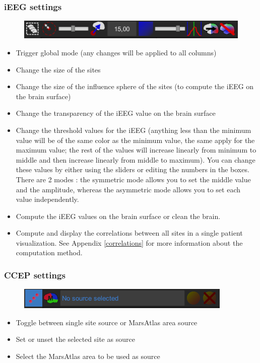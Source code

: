 \documentclass[a4paper]{article}
\begin{document}
\subsubsection{iEEG settings}
\begin{figure}[H]
\begin{center}
\includegraphics[scale=0.5]{iEEGSettings.png}
\end{center}
\end{figure}
\begin{itemize}
\item Trigger global mode (any changes will be applied to all columns)
\item Change the size of the sites
\item Change the size of the influence sphere of the sites (to compute the iEEG on the brain surface)
\item Change the transparency of the iEEG value on the brain surface
\item Change the threshold values for the iEEG (anything less than the minimum value will be of the same color as the minimum value, the same apply for the maximum value; the rest of the values will increase linearly from minimum to middle and then increase linearly from middle to maximum). You can change these values by either using the sliders or editing the numbers in the boxes. There are 2 modes : the symmetric mode allows you to set the middle value and the amplitude, whereas the asymmetric mode allows you to set each value independently.
\item Compute the iEEG values on the brain surface or clean the brain.
\item Compute and display the correlations between all sites in a single patient visualization. See Appendix \ref{correlations} for more information about the computation method.
\end{itemize}
\subsubsection{CCEP settings}
\begin{figure}[H]
\begin{center}
\includegraphics[scale=0.5]{CCEPSettings.png}
\end{center}
\end{figure}
\begin{itemize}
\item Toggle between single site source or MarsAtlas area source
\item Set or unset the selected site as source
\item Select the MarsAtlas area to be used as source
\end{itemize}
\end{document}
